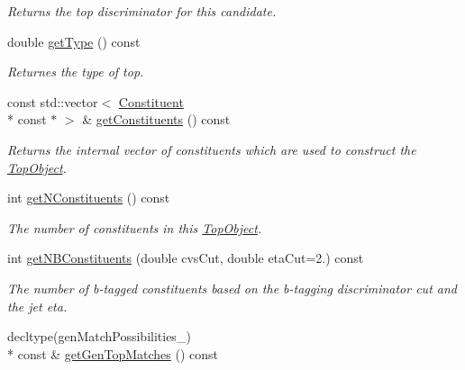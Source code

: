 \begin{DoxyCompactItemize}
\begin{DoxyCompactList}\small\item\em Returns the top discriminator for this candidate. \end{DoxyCompactList}\item 
\hypertarget{classTopObject_a0be777a60c1bfab05e40a4b352193071}{double \hyperlink{classTopObject_a0be777a60c1bfab05e40a4b352193071}{get\-Type} () const }\label{classTopObject_a0be777a60c1bfab05e40a4b352193071}

\begin{DoxyCompactList}\small\item\em Returnes the type of top. \end{DoxyCompactList}\item 
\hypertarget{classTopObject_a3bd54d089da20318d1733c2d4e28493a}{const std\-::vector$<$ \hyperlink{classConstituent}{Constituent} \\*
const $\ast$ $>$ \& \hyperlink{classTopObject_a3bd54d089da20318d1733c2d4e28493a}{get\-Constituents} () const }\label{classTopObject_a3bd54d089da20318d1733c2d4e28493a}

\begin{DoxyCompactList}\small\item\em Returns the internal vector of constituents which are used to construct the \hyperlink{classTopObject}{Top\-Object}. \end{DoxyCompactList}\item 
\hypertarget{classTopObject_a562bafee171bf66c283d519c8021672d}{int \hyperlink{classTopObject_a562bafee171bf66c283d519c8021672d}{get\-N\-Constituents} () const }\label{classTopObject_a562bafee171bf66c283d519c8021672d}

\begin{DoxyCompactList}\small\item\em The number of constituents in this \hyperlink{classTopObject}{Top\-Object}. \end{DoxyCompactList}\item 
\hypertarget{classTopObject_a2b5bb6b014c80262b748171698ba1042}{int \hyperlink{classTopObject_a2b5bb6b014c80262b748171698ba1042}{get\-N\-B\-Constituents} (double cvs\-Cut, double eta\-Cut=2.) const }\label{classTopObject_a2b5bb6b014c80262b748171698ba1042}

\begin{DoxyCompactList}\small\item\em The number of b-\/tagged constituents based on the b-\/tagging discriminator cut and the jet eta. \end{DoxyCompactList}\item 
\hypertarget{classTopObject_a51cc6fbaacb2cf502cad0b57d99ae91f}{decltype(gen\-Match\-Possibilities\-\_\-) \\*
const \& \hyperlink{classTopObject_a51cc6fbaacb2cf502cad0b57d99ae91f}{get\-Gen\-Top\-Matches} () const }\label{classTopObject_a51cc6fbaacb2cf502cad0b57d99ae91f}


\end{DoxyCompactItemize}
